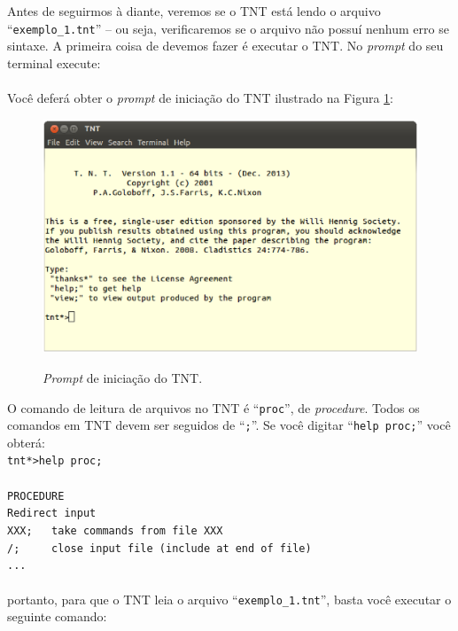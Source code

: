 \begin{refsection}
Antes de seguirmos à diante, veremos se o TNT está lendo o arquivo ``\texttt{exemplo\_1.tnt}'' -- ou seja, verificaremos se o arquivo não possuí nenhum erro se sintaxe. A primeira coisa de devemos fazer é executar o TNT. No \textit{prompt} do seu terminal execute:\\
\indent\indent\indent{}\\

Você deferá obter o \textit{prompt} de iniciação do TNT ilustrado na Figura \ref{tut4:fig:tnt1}:\\

  \begin{figure}[H]
       \centering
      {\includegraphics[scale=0.60]{figures/tut4/tnt_1.eps}}
      {\caption[\textit{\textit{Prompt de TNT} }]{\textit{Prompt} de iniciação do TNT.}\label{tut4:fig:tnt1}}
  \end{figure}


O comando de leitura de arquivos no TNT é ``\texttt{proc}'', de \textit{procedure}. Todos os comandos em TNT devem ser seguidos de ``\texttt{;}''. Se você digitar ``\texttt{help proc;}'' você obterá:
\\
\indent\indent\texttt{tnt*>help proc;}\\
\\
\indent\indent\texttt{PROCEDURE}\\
\indent\indent\indent\texttt{Redirect input }\\
\indent\indent\indent\texttt{XXX;~~~take commands from file XXX }\\
\indent\indent\indent\texttt{/;~~~~~close input file (include at end of file) }\\
\indent\indent\indent\texttt{...}\\
\\
portanto, para que o TNT leia o arquivo ``\texttt{exemplo\_1.tnt}'', basta você executar o seguinte comando:\\


\end{refsection}
